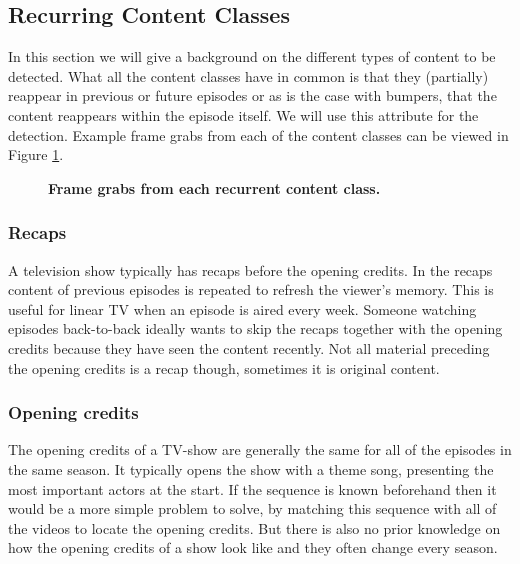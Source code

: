 \documentclass{article}
\begin{document}
\subsection{Recurring Content Classes} \label{section:segmentclasses}
In this section we will give a background on the different types of content to be detected. What all the content classes have in common is that they (partially) reappear in previous or future episodes or as is the case with bumpers, that the content reappears within the episode itself. We will use this attribute for the detection. Example frame grabs from each of the content classes can be viewed in Figure \ref{fig:introductionexamples}.

\begin{figure}[h]
	\caption{\textbf{Frame grabs from each recurrent content class.}}
	\label{fig:introductionexamples}
\end{figure}

\subsubsection{Recaps}
A television show typically has recaps before the opening credits. In the recaps content of previous episodes is repeated to refresh the viewer's memory. This is useful for linear TV when an episode is aired every week. Someone watching episodes back-to-back ideally wants to skip the recaps together with the opening credits because they have seen the content recently. Not all material preceding the opening credits is a recap though, sometimes it is original content.

\subsubsection{Opening credits}
The opening credits of a TV-show are generally the same for all of the episodes in the same season. It typically opens the show with a theme song, presenting the most important actors at the start. If the sequence is known beforehand then it would be a more simple problem to solve, by matching this sequence with all of the videos to locate the opening credits. But there is also no prior knowledge on how the opening credits of a show look like and they often change every season.
\end{document}
